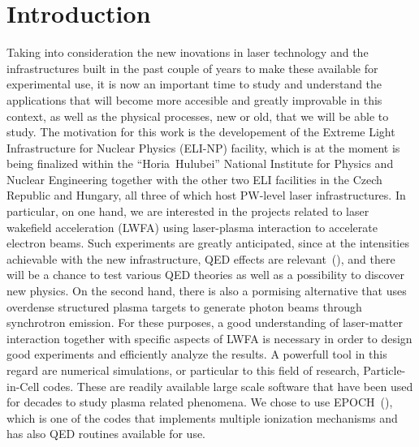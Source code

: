 \documentclass[12pt, class=report, crop=false]{standalone}
\begin{document}
\chapter*{Introduction}%
\label{chap:intro}

Taking into consideration the new inovations in laser technology and the infrastructures built in the past couple of years to make these available for experimental use, it is now an important time to study and understand the applications that will become more accesible and greatly improvable in this context, as well as the physical processes, new or old, that we will be able to study. The motivation for this work is the developement of the Extreme Light Infrastructure for Nuclear Physics (ELI-NP) facility, which is at the moment is being finalized within the ``Horia~Hulubei'' National Institute for Physics and Nuclear Engineering together with the other two ELI facilities in the Czech Republic and Hungary, all three of which host PW-level laser infrastructures. In particular, on one hand, we are interested in the projects related to laser wakefield acceleration (LWFA) using laser-plasma interaction to accelerate electron beams. Such experiments are greatly anticipated, since at the intensities achievable with the new infrastructure, QED effects are relevant~(\cite{tanakaCurrentStatusHighlights2020}), and there will be a chance to test various QED theories as well as a possibility to discover new physics. On the second hand, there is also a pormising alternative that uses overdense structured plasma targets to generate photon beams through synchrotron emission. For these purposes, a good understanding of laser-matter interaction together with specific aspects of LWFA is necessary in order to design good experiments and efficiently analyze the results. A powerfull tool in this regard are numerical simulations, or particular to this field of research, Particle-in-Cell codes. These are readily available large scale software that have been used for decades to study plasma related phenomena. We chose to use EPOCH~(\cite{arberContemporaryParticleincellApproach2015}), which is one of the codes that implements multiple ionization mechanisms and has also QED routines available for use.
\end{document}
